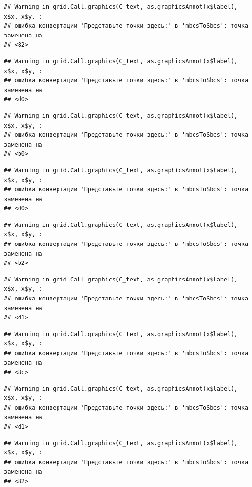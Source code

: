 \documentclass[]{book}
\begin{document}
\begin{verbatim}
## Warning in grid.Call.graphics(C_text, as.graphicsAnnot(x$label), x$x, x$y, :
## ошибка конвертации 'Представьте точки здесь:' в 'mbcsToSbcs': точка заменена на
## <82>
\end{verbatim}

\begin{verbatim}
## Warning in grid.Call.graphics(C_text, as.graphicsAnnot(x$label), x$x, x$y, :
## ошибка конвертации 'Представьте точки здесь:' в 'mbcsToSbcs': точка заменена на
## <d0>
\end{verbatim}

\begin{verbatim}
## Warning in grid.Call.graphics(C_text, as.graphicsAnnot(x$label), x$x, x$y, :
## ошибка конвертации 'Представьте точки здесь:' в 'mbcsToSbcs': точка заменена на
## <b0>
\end{verbatim}

\begin{verbatim}
## Warning in grid.Call.graphics(C_text, as.graphicsAnnot(x$label), x$x, x$y, :
## ошибка конвертации 'Представьте точки здесь:' в 'mbcsToSbcs': точка заменена на
## <d0>
\end{verbatim}

\begin{verbatim}
## Warning in grid.Call.graphics(C_text, as.graphicsAnnot(x$label), x$x, x$y, :
## ошибка конвертации 'Представьте точки здесь:' в 'mbcsToSbcs': точка заменена на
## <b2>
\end{verbatim}

\begin{verbatim}
## Warning in grid.Call.graphics(C_text, as.graphicsAnnot(x$label), x$x, x$y, :
## ошибка конвертации 'Представьте точки здесь:' в 'mbcsToSbcs': точка заменена на
## <d1>
\end{verbatim}

\begin{verbatim}
## Warning in grid.Call.graphics(C_text, as.graphicsAnnot(x$label), x$x, x$y, :
## ошибка конвертации 'Представьте точки здесь:' в 'mbcsToSbcs': точка заменена на
## <8c>
\end{verbatim}

\begin{verbatim}
## Warning in grid.Call.graphics(C_text, as.graphicsAnnot(x$label), x$x, x$y, :
## ошибка конвертации 'Представьте точки здесь:' в 'mbcsToSbcs': точка заменена на
## <d1>
\end{verbatim}

\begin{verbatim}
## Warning in grid.Call.graphics(C_text, as.graphicsAnnot(x$label), x$x, x$y, :
## ошибка конвертации 'Представьте точки здесь:' в 'mbcsToSbcs': точка заменена на
## <82>
\end{verbatim}
\end{document}
